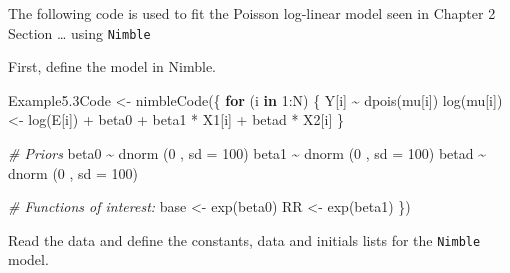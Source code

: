 \documentclass[
]{book}
\newenvironment{Shaded}{\begin{snugshade}}{\end{snugshade}}
\newcommand{\AttributeTok}[1]{\textcolor[rgb]{0.77,0.63,0.00}{#1}}
\newcommand{\CommentTok}[1]{\textcolor[rgb]{0.56,0.35,0.01}{\textit{#1}}}
\newcommand{\ControlFlowTok}[1]{\textcolor[rgb]{0.13,0.29,0.53}{\textbf{#1}}}
\newcommand{\DecValTok}[1]{\textcolor[rgb]{0.00,0.00,0.81}{#1}}
\newcommand{\FloatTok}[1]{\textcolor[rgb]{0.00,0.00,0.81}{#1}}
\newcommand{\FunctionTok}[1]{\textcolor[rgb]{0.00,0.00,0.00}{#1}}
\newcommand{\NormalTok}[1]{#1}
\newcommand{\OtherTok}[1]{\textcolor[rgb]{0.56,0.35,0.01}{#1}}
\newcommand{\SpecialCharTok}[1]{\textcolor[rgb]{0.00,0.00,0.00}{#1}}
\begin{document}
The following code is used to fit the Poisson log-linear model seen in Chapter 2 Section \ldots{} using \texttt{Nimble}

First, define the model in Nimble.

\begin{Shaded}
\begin{Highlighting}[]
\NormalTok{Example5}\FloatTok{.3}\NormalTok{Code }\OtherTok{\textless{}{-}} \FunctionTok{nimbleCode}\NormalTok{(\{}
  \ControlFlowTok{for}\NormalTok{ (i }\ControlFlowTok{in} \DecValTok{1}\SpecialCharTok{:}\NormalTok{N) \{}
\NormalTok{    Y[i] }\SpecialCharTok{\textasciitilde{}} \FunctionTok{dpois}\NormalTok{(mu[i])}
    \FunctionTok{log}\NormalTok{(mu[i]) }\OtherTok{\textless{}{-}} \FunctionTok{log}\NormalTok{(E[i]) }\SpecialCharTok{+}\NormalTok{ beta0 }\SpecialCharTok{+}\NormalTok{ beta1 }\SpecialCharTok{*}\NormalTok{ X1[i] }\SpecialCharTok{+}\NormalTok{ betad }\SpecialCharTok{*}\NormalTok{ X2[i]}
\NormalTok{  \}}
  
  \CommentTok{\# Priors}
\NormalTok{  beta0 }\SpecialCharTok{\textasciitilde{}} \FunctionTok{dnorm}\NormalTok{ (}\DecValTok{0}\NormalTok{ , }\AttributeTok{sd =} \DecValTok{100}\NormalTok{)}
\NormalTok{  beta1 }\SpecialCharTok{\textasciitilde{}} \FunctionTok{dnorm}\NormalTok{ (}\DecValTok{0}\NormalTok{ , }\AttributeTok{sd =} \DecValTok{100}\NormalTok{)}
\NormalTok{  betad }\SpecialCharTok{\textasciitilde{}} \FunctionTok{dnorm}\NormalTok{ (}\DecValTok{0}\NormalTok{ , }\AttributeTok{sd =} \DecValTok{100}\NormalTok{)}
  
  \CommentTok{\# Functions of interest:}
\NormalTok{  base }\OtherTok{\textless{}{-}} \FunctionTok{exp}\NormalTok{(beta0)}
\NormalTok{  RR }\OtherTok{\textless{}{-}} \FunctionTok{exp}\NormalTok{(beta1)}
\NormalTok{\})}
\end{Highlighting}
\end{Shaded}

Read the data and define the constants, data and initials lists for the \texttt{Nimble} model.
\end{document}
